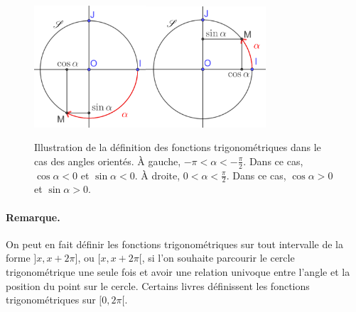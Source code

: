		\begin{figure}
			\includegraphics[width=0.37\textwidth]{image/fct_trigo/cossin_oriente_m.png}\hspace{0.1cm}\includegraphics[width=0.4\textwidth]{image/fct_trigo/cossin_oriente_p.png}
			\caption{Illustration de la définition des fonctions trigonométriques dans le cas des angles orientés. À gauche, $-\pi<\alpha<-\frac{\pi}{2}$. Dans ce cas, $\cos\alpha<0$ et $\sin\alpha<0$. À droite, $0<\alpha<\frac{\pi}{2}$. Dans ce cas, $\cos\alpha>0$ et $\sin\alpha>0$.}
		\end{figure}

		\paragraph{Remarque.} On peut en fait définir les fonctions trigonométriques sur tout intervalle de la forme $]x,x+2\pi]$, ou $[x,x+2\pi[$, si l'on souhaite parcourir le cercle trigonométrique une seule fois et avoir une relation univoque entre l'angle et la position du point sur le cercle. Certains livres définissent les fonctions trigonométriques sur $[0,2\pi[$.

		\vspace{0.3cm}

